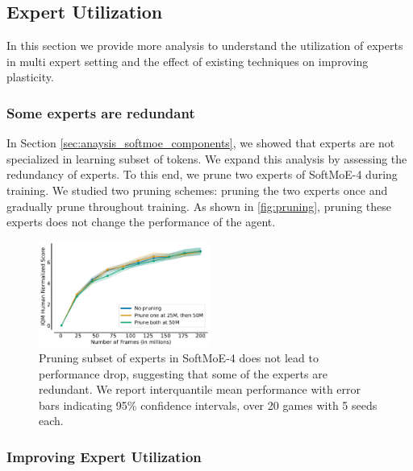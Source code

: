 \subsection{Expert Utilization}
\label{appendix_sec:expertUtilization}
In this section we provide more analysis to understand the utilization of experts in multi expert setting and the effect of existing techniques on improving plasticity. 

\subsubsection{Some experts are redundant} In Section \ref{sec:anaysis_softmoe_components}, we showed that experts are not specialized in learning subset of tokens. We expand this analysis by assessing the redundancy of experts. To this end, we prune two experts of SoftMoE-4 during training. We studied two pruning schemes: pruning the two experts once and gradually prune throughout training. As shown in \autoref{fig:pruning}, pruning these experts does not change the performance of the agent.


\begin{figure}[!h]
    \centering
    \includegraphics[width=0.5\textwidth]{figures/results/SoftMoE-4-ExpertsPruning.pdf}
    \vspace{-0.4cm}
    \caption{Pruning subset of experts in SoftMoE-4 does not lead to performance drop, suggesting that some of the experts are redundant. We report interquantile mean performance with error bars indicating 95\% confidence intervals, over 20 games with 5 seeds each.}
    \label{fig:pruning}
\end{figure}

\subsubsection{Improving Expert Utilization}

